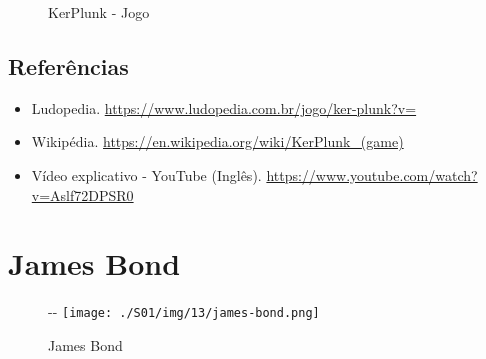 \begin{figure}
  \centering
    \caption{KerPlunk - Jogo\label{fig:ker-plunk-jogo}}
\end{figure}

\hypertarget{referuxeancias-1}{%
\subsection{Referências}\label{referuxeancias-1}}

\begin{itemize}
\tightlist
\item
  \sloppy Ludopedia. \url{https://www.ludopedia.com.br/jogo/ker-plunk?v=}
\item
  \sloppy Wikipédia. \url{https://en.wikipedia.org/wiki/KerPlunk_(game)}
\item
  \sloppy Vídeo explicativo - YouTube (Inglês). \url{https://www.youtube.com/watch?v=Aslf72DPSR0}
\end{itemize}

\hypertarget{james-bond}{%
\section{James Bond}\label{james-bond}}

\begin{figure}[!ht]
  \begin{adjustwidth}{-\oddsidemargin-1in}{-\rightmargin}
    \centering
    \texttt{[image: ./S01/img/13/james-bond.png]}
    \caption{James Bond\label{fig:james-bond}}
  \end{adjustwidth}
\end{figure}

